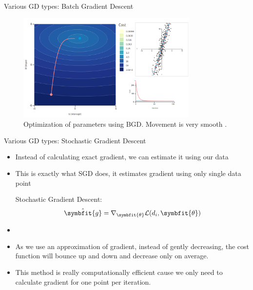 \begin{frame}{Various GD types: Batch Gradient Descent}
	\begin{figure}[H]
		\centering
		\includegraphics[width=0.8\textwidth]{Images/bgd.png}
		\caption{Optimization of parameters using BGD. Movement is very smooth \cite{katanforoosh-kunin-opt}.}
	\end{figure} 
\end{frame}

\begin{frame}{Various GD types: Stochastic Gradient Descent}
	\begin{itemize}
		\item Instead of calculating exact gradient, we can estimate it using our data
		\item This is exactly what SGD does, it estimates gradient using {\color{newcolor}only single data point}
		\begin{block}{Stochastic Gradient Descent:}
			\[
			\hat{\symbfit{g}} = \nabla_{\symbfit{\theta}} \mathcal{L}(d_i, \symbfit{\theta})
			\]
		\end{block}
		\item[]
		\item As we use an approximation of gradient, instead of gently decreasing, the cost function will bounce up and down and decrease only on average.
		\item This method is really computationally efficient cause we only need to calculate gradient for one point per iteration. 
	\end{itemize}
\end{frame}

